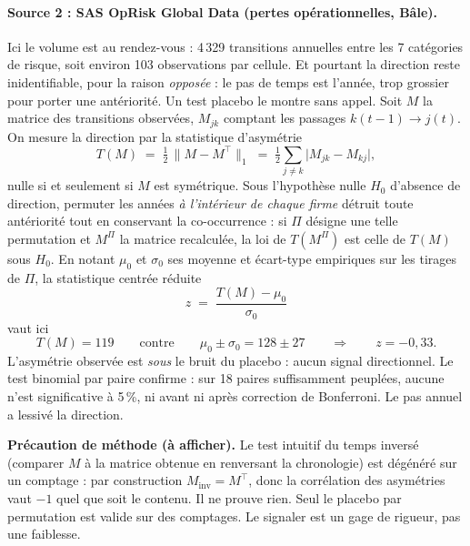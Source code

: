\paragraph{Source 2 : SAS OpRisk Global Data (pertes opérationnelles, Bâle).}
Ici le volume est au rendez-vous : 4\,329 transitions annuelles entre les
7 catégories de risque, soit environ 103 observations par cellule. Et pourtant la
direction reste inidentifiable, pour la raison \emph{opposée} : le pas de temps est
l'année, trop grossier pour porter une antériorité. Un test placebo le montre sans
appel. Soit $M$ la matrice des transitions observées, $M_{jk}$ comptant les passages
$k(t-1)\to j(t)$. On mesure la direction par la statistique d'asymétrie
\begin{equation}
  T(M) \;=\; \tfrac{1}{2}\,\lVert M - M^{\top}\rVert_1
        \;=\; \tfrac{1}{2}\sum_{j\neq k}\bigl|M_{jk}-M_{kj}\bigr| ,
  \label{eq:asymetrie}
\end{equation}
nulle si et seulement si $M$ est symétrique. Sous l'hypothèse nulle $H_0$ d'absence de
direction, permuter les années \emph{à l'intérieur de chaque firme} détruit toute antériorité
tout en conservant la co-occurrence : si $\Pi$ désigne une telle permutation et $M^{\Pi}$ la
matrice recalculée, la loi de $T(M^{\Pi})$ est celle de $T(M)$ sous $H_0$. En notant $\mu_0$ et
$\sigma_0$ ses moyenne et écart-type empiriques sur les tirages de $\Pi$, la statistique
centrée réduite
\begin{equation}
  z \;=\; \frac{T(M)-\mu_0}{\sigma_0}
  \label{eq:placebo-z}
\end{equation}
vaut ici
\[
T(M) = 119 \qquad\text{contre}\qquad \mu_0 \pm \sigma_0 = 128 \pm 27
\qquad\Longrightarrow\qquad z = -0{,}33 .
\]
L'asymétrie observée est \emph{sous} le bruit du placebo : aucun signal directionnel. Le
test binomial par paire confirme : sur 18 paires suffisamment peuplées, aucune
n'est significative à 5\,\%, ni avant ni après correction de Bonferroni. Le pas annuel a
lessivé la direction.

\begin{cle}
\textbf{Précaution de méthode (à afficher).} Le test intuitif du \og temps inversé \fg{}
(comparer $M$ à la matrice obtenue en renversant la chronologie) est dégénéré sur
un comptage : par construction $M_{\text{inv}} = M^\top$, donc la corrélation des asymétries
vaut $-1$ quel que soit le contenu. Il ne prouve rien. Seul le placebo par
permutation est valide sur des comptages. Le signaler est un gage de rigueur, pas une
faiblesse.
\end{cle}

